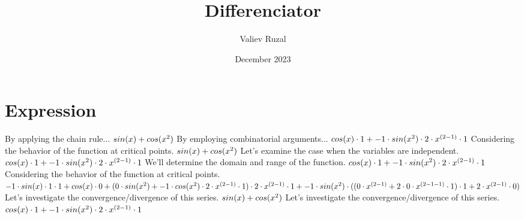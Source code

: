 \documentclass[a4paper, 12pt]{article}
\title{ Differenciator }
\author{Valiev Ruzal}
\date{December 2023}
\begin{document}
\maketitle
\section{Expression}
By applying the chain rule...\newline
$ sin( x )  +  cos(  { x } ^ {\small 2 }  ) $\newline
By employing combinatorial arguments...\newline
$ cos( x )  \cdot 1 + -1 \cdot  sin(  { x } ^ {\small 2 }  )  \cdot 2 \cdot  { x } ^ {\small  ( 2 - 1 )  }  \cdot 1$\newline
Considering the behavior of the function at critical points.\newline
$ sin( x )  +  cos(  { x } ^ {\small 2 }  ) $\newline
Let's examine the case when the variables are independent.\newline
$ cos( x )  \cdot 1 + -1 \cdot  sin(  { x } ^ {\small 2 }  )  \cdot 2 \cdot  { x } ^ {\small  ( 2 - 1 )  }  \cdot 1$\newline
We'll determine the domain and range of the function.\newline
$ cos( x )  \cdot 1 + -1 \cdot  sin(  { x } ^ {\small 2 }  )  \cdot 2 \cdot  { x } ^ {\small  ( 2 - 1 )  }  \cdot 1$\newline
Considering the behavior of the function at critical points.\newline
$-1 \cdot  sin( x )  \cdot 1 \cdot 1 +  cos( x )  \cdot 0 +  ( 0 \cdot  sin(  { x } ^ {\small 2 }  )  + -1 \cdot  cos(  { x } ^ {\small 2 }  )  \cdot 2 \cdot  { x } ^ {\small  ( 2 - 1 )  }  \cdot 1 )  \cdot 2 \cdot  { x } ^ {\small  ( 2 - 1 )  }  \cdot 1 + -1 \cdot  sin(  { x } ^ {\small 2 }  )  \cdot  (  ( 0 \cdot  { x } ^ {\small  ( 2 - 1 )  }  + 2 \cdot 0 \cdot  { x } ^ {\small  ( 2 - 1 - 1 )  }  \cdot 1 )  \cdot 1 + 2 \cdot  { x } ^ {\small  ( 2 - 1 )  }  \cdot 0 ) $\newline
Let's investigate the convergence/divergence of this series.\newline
$ sin( x )  +  cos(  { x } ^ {\small 2 }  ) $\newline
Let's investigate the convergence/divergence of this series.\newline
$ cos( x )  \cdot 1 + -1 \cdot  sin(  { x } ^ {\small 2 }  )  \cdot 2 \cdot  { x } ^ {\small  ( 2 - 1 )  }  \cdot 1$\newline
\end{document}
